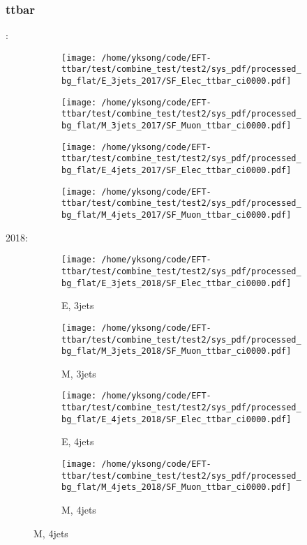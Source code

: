 \documentclass{beamer}
\begin{document}
\begin{frame}
\frametitle{ttbar}
\fontsize{5}{1}:
\begin{figure}
\centering
\begin{subfigure}[b]{0.24\textwidth}
\texttt{[image: /home/yksong/code/EFT-ttbar/test/combine\_test/test2/sys\_pdf/processed\_bg\_flat/E\_3jets\_2017/SF\_Elec\_ttbar\_ci0000.pdf]}
\end{subfigure}
\begin{subfigure}[b]{0.24\textwidth}
\texttt{[image: /home/yksong/code/EFT-ttbar/test/combine\_test/test2/sys\_pdf/processed\_bg\_flat/M\_3jets\_2017/SF\_Muon\_ttbar\_ci0000.pdf]}
\end{subfigure}
\begin{subfigure}[b]{0.24\textwidth}
\texttt{[image: /home/yksong/code/EFT-ttbar/test/combine\_test/test2/sys\_pdf/processed\_bg\_flat/E\_4jets\_2017/SF\_Elec\_ttbar\_ci0000.pdf]}
\end{subfigure}
\begin{subfigure}[b]{0.24\textwidth}
\texttt{[image: /home/yksong/code/EFT-ttbar/test/combine\_test/test2/sys\_pdf/processed\_bg\_flat/M\_4jets\_2017/SF\_Muon\_ttbar\_ci0000.pdf]}
\end{subfigure}
\end{figure}
2018:
\begin{figure}
\centering
\begin{subfigure}[b]{0.24\textwidth}
\texttt{[image: /home/yksong/code/EFT-ttbar/test/combine\_test/test2/sys\_pdf/processed\_bg\_flat/E\_3jets\_2018/SF\_Elec\_ttbar\_ci0000.pdf]}
\captionsetup{font=tiny}
\caption{E, 3jets}
\end{subfigure}
\begin{subfigure}[b]{0.24\textwidth}
\texttt{[image: /home/yksong/code/EFT-ttbar/test/combine\_test/test2/sys\_pdf/processed\_bg\_flat/M\_3jets\_2018/SF\_Muon\_ttbar\_ci0000.pdf]}
\captionsetup{font=tiny}
\caption{M, 3jets}
\end{subfigure}
\begin{subfigure}[b]{0.24\textwidth}
\texttt{[image: /home/yksong/code/EFT-ttbar/test/combine\_test/test2/sys\_pdf/processed\_bg\_flat/E\_4jets\_2018/SF\_Elec\_ttbar\_ci0000.pdf]}
\captionsetup{font=tiny}
\caption{E, 4jets}
\end{subfigure}
\begin{subfigure}[b]{0.24\textwidth}
\texttt{[image: /home/yksong/code/EFT-ttbar/test/combine\_test/test2/sys\_pdf/processed\_bg\_flat/M\_4jets\_2018/SF\_Muon\_ttbar\_ci0000.pdf]}
\captionsetup{font=tiny}
\caption{M, 4jets}
\end{subfigure}
\end{figure}
\end{frame}
\end{document}

